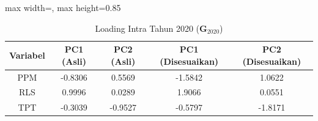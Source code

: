 \begin{table}[H]
\centering
\caption{Loading Intra Tahun 2020 ($\mathbf{G}_{2020}$)} \label{tab:sampleloading_intra_2020}
\begin{adjustbox}{max width=\textwidth, max height=0.85\textheight}
\begin{tabular}{|c|c|c|c|c|}
\hline
\textbf{Variabel} & \textbf{PC1 (Asli)} & \textbf{PC2 (Asli)} & \textbf{PC1 (Disesuaikan)} & \textbf{PC2 (Disesuaikan)} \\
\hline
PPM & -0.8306 & 0.5569 & -1.5842 & 1.0622 \\
RLS & 0.9996 & 0.0289 & 1.9066 & 0.0551 \\
TPT & -0.3039 & -0.9527 & -0.5797 & -1.8171 \\
\hline
\end{tabular}
\end{adjustbox}
\end{table}